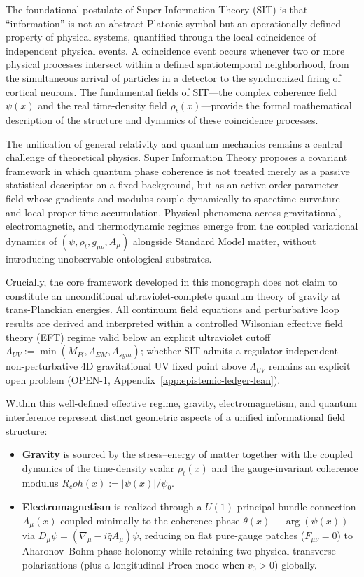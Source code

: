 \documentclass[american,11pt,letterpaper]{article}
\newcommand{\Rcoh}{R_{\mathrm{coh}}}
\def\mathrm#1{#1}%
\def\texttt#1{#1}%
\def\Rcoh{R_coh}%
\begin{document}
The foundational postulate of Super Information Theory (SIT) is that ``information'' is not an abstract Platonic symbol but an operationally defined property of physical systems, quantified through the local coincidence of independent physical events. A coincidence event occurs whenever two or more physical processes intersect within a defined spatiotemporal neighborhood, from the simultaneous arrival of particles in a detector to the synchronized firing of cortical neurons. The fundamental fields of SIT---the complex coherence field $\psi(x)$ and the real time-density field $\rho_t(x)$---provide the formal mathematical description of the structure and dynamics of these coincidence processes.

The unification of general relativity and quantum mechanics remains a central challenge of theoretical physics. Super Information Theory proposes a covariant framework in which quantum phase coherence is not treated merely as a passive statistical descriptor on a fixed background, but as an active order-parameter field whose gradients and modulus couple dynamically to spacetime curvature and local proper-time accumulation. Physical phenomena across gravitational, electromagnetic, and thermodynamic regimes emerge from the coupled variational dynamics of $(\psi, \rho_t, g_{\mu\nu}, A_\mu)$ alongside Standard Model matter, without introducing unobservable ontological substrates.

Crucially, the core framework developed in this monograph does not claim to constitute an unconditional ultraviolet-complete quantum theory of gravity at trans-Planckian energies. All continuum field equations and perturbative loop results are derived and interpreted within a controlled Wilsonian effective field theory (EFT) regime valid below an explicit ultraviolet cutoff $\Lambda_{\mathrm{UV}} := \min(M_{\mathrm{Pl}}, \Lambda_{\mathrm{EM}}, \Lambda_{\mathrm{sym}})$; whether SIT admits a regulator-independent non-perturbative 4D gravitational UV fixed point above $\Lambda_{\mathrm{UV}}$ remains an explicit open problem (\texttt{OPEN-1}, Appendix~\ref{app:epistemic-ledger-lean}).

Within this well-defined effective regime, gravity, electromagnetism, and quantum interference represent distinct geometric aspects of a unified informational field structure:
\begin{itemize}
  \item \textbf{Gravity} is sourced by the stress--energy of matter together with the coupled dynamics of the time-density scalar $\rho_t(x)$ and the gauge-invariant coherence modulus $\Rcoh(x) := |\psi(x)|/\psi_0$.
  \item \textbf{Electromagnetism} is realized through a $U(1)$ principal bundle connection $A_\mu(x)$ coupled minimally to the coherence phase $\theta(x) \equiv \arg(\psi(x))$ via $D_\mu\psi = (\nabla_\mu - i\hat{q}A_\mu)\psi$, reducing on flat pure-gauge patches ($F_{\mu\nu}=0$) to Aharonov--Bohm phase holonomy while retaining two physical transverse polarizations (plus a longitudinal Proca mode when $v_0 > 0$) globally.
\end{itemize}
\end{document}
